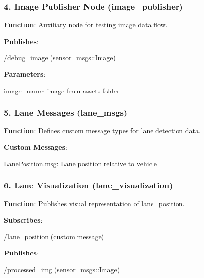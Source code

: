 \subsubsection*{4. Image Publisher Node ({\ttfamily image\+\_\+publisher})}

{\bfseries Function}\+: Auxiliary node for testing image data flow.
\begin{DoxyItemize}
\item {\bfseries Publishes}\+:
\begin{DoxyItemize}
\item {\ttfamily /debug\+\_\+image} (sensor\+\_\+msgs\+::\+Image)
\end{DoxyItemize}
\item {\bfseries Parameters}\+:
\begin{DoxyItemize}
\item {\ttfamily image\+\_\+name}\+: image from assets folder
\end{DoxyItemize}
\end{DoxyItemize}

\subsubsection*{5. Lane Messages ({\ttfamily lane\+\_\+msgs})}

{\bfseries Function}\+: Defines custom message types for lane detection data.
\begin{DoxyItemize}
\item {\bfseries Custom Messages}\+:
\begin{DoxyItemize}
\item {\ttfamily Lane\+Position.\+msg}\+: Lane position relative to vehicle
\end{DoxyItemize}
\end{DoxyItemize}

\subsubsection*{6. Lane Visualization ({\ttfamily lane\+\_\+visualization})}

{\bfseries Function}\+: Publishes visual representation of lane\+\_\+position.
\begin{DoxyItemize}
\item {\bfseries Subscribes}\+:
\begin{DoxyItemize}
\item {\ttfamily /lane\+\_\+position} (custom message)
\end{DoxyItemize}
\item {\bfseries Publishes}\+:
\begin{DoxyItemize}
\item {\ttfamily /processed\+\_\+img} (sensor\+\_\+msgs\+::\+Image)
\end{DoxyItemize}
\end{DoxyItemize}

